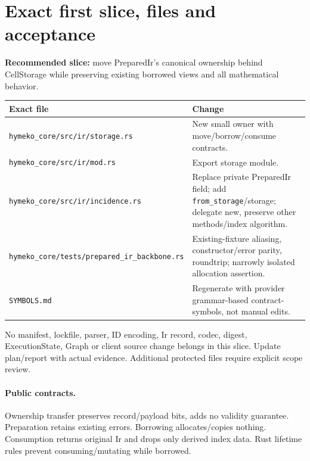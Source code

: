 \documentclass[10pt,a4paper]{article}
\newcommand{\code}[1]{{\small\nolinkurl{#1}}}
\begin{document}
\section{Exact first slice, files and acceptance}
\label{sec:first}
\textbf{Recommended slice:} move PreparedIr's canonical ownership behind CellStorage while preserving existing borrowed views and all mathematical behavior.
\begin{longtable}{L{90mm}L{76mm}}
\toprule Exact file & Change\\\midrule
\code{hymeko_core/src/ir/storage.rs} & New small owner with move/borrow/consume contracts.\\
\code{hymeko_core/src/ir/mod.rs} & Export storage module.\\
\code{hymeko_core/src/ir/incidence.rs} & Replace private PreparedIr field; add \code{from_storage}/storage; delegate new, preserve other methods/index algorithm.\\
\code{hymeko_core/tests/prepared_ir_backbone.rs} & Existing-fixture aliasing, constructor/error parity, roundtrip; narrowly isolated allocation assertion.\\
\code{SYMBOLS.md} & Regenerate with provider grammar-based contract-symbols, not manual edits.\\
\bottomrule
\end{longtable}
No manifest, lockfile, parser, ID encoding, Ir record, codec, digest, ExecutionState, Graph or client source change belongs in this slice. Update plan/report with actual evidence. Additional protected files require explicit scope review.

\paragraph{Public contracts.}
Ownership transfer preserves record/payload bits, adds no validity guarantee. Preparation retains existing errors. Borrowing allocates/copies nothing. Consumption returns original Ir and drops only derived index data. Rust lifetime rules prevent consuming/mutating while borrowed.
\end{document}
